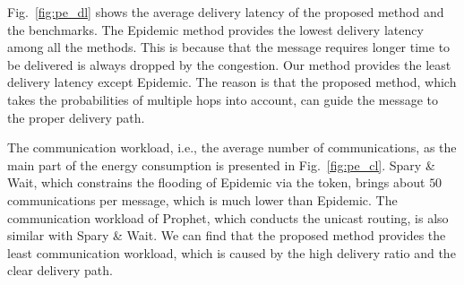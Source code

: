 Fig.~\ref{fig:pe_dl} shows the average delivery latency of the proposed method and the benchmarks.
The Epidemic method provides the lowest delivery latency among all the methods.
This is because that the message requires longer time to be delivered is always dropped by the congestion.
Our method provides the least delivery latency except Epidemic.
The reason is that the proposed method, which takes the probabilities of multiple hops into account,
can guide the message to the proper delivery path.

The communication workload, i.e., the average number of communications,
as the main part of the energy consumption is presented in Fig.~\ref{fig:pe_cl}.
Spary \& Wait, which constrains the flooding of Epidemic via the token,
brings about $50$ communications per message,
which is much lower than Epidemic.
The communication workload of Prophet, which conducts the unicast routing,
is also similar with Spary \& Wait.
We can find that the proposed method provides the least communication workload,
which is caused by the high delivery ratio and the clear delivery path.

